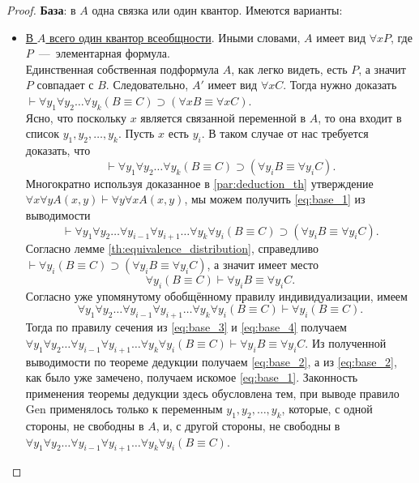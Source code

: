 \begin{proof}
    \textbf{База}: в $A$ одна связка или один квантор. Имеются варианты:
    \begin{itemize}
        \item \underline{В $A$ всего один квантор всеобщности}. Иными словами, $A$ имеет вид $\forall xP$, где $P$~---~элементарная формула. \\
        Единственная собственная подформула $A$, как легко видеть, есть $P$, а значит $P$ совпадает с $B$. Следовательно, $A'$ имеет вид $\forall xC$. Тогда нужно доказать $\vdash \forall y_1\forall y_2\dots\forall y_k(B \equiv C) \supset (\forall xB \equiv \forall xC)$. \\
        Ясно, что поскольку $x$ является связанной переменной в $A$, то она входит в список $y_1, y_2, \dots, y_k$. Пусть $x$ есть $y_i$. В таком случае от нас требуется доказать, что
        \begin{equation}\label{eq:base_1}
            \vdash \forall y_1\forall y_2\dots\forall y_k(B \equiv C) \supset (\forall y_iB \equiv \forall y_iC).
        \end{equation}
        Многократно используя доказанное в \ref{par:deduction_th} утверждение $\forall x\forall yA(x, y) \vdash \forall y\forall xA(x, y)$, мы можем получить \eqref{eq:base_1} из выводимости
        \begin{equation}\label{eq:base_2}
            \vdash \forall y_1\forall y_2\dots\forall y_{i - 1}\forall y_{i + 1}\dots\forall y_k\forall y_i(B \equiv C) \supset (\forall y_iB \equiv \forall y_iC). 
        \end{equation}
        Согласно лемме \ref{th:equivalence_distribution}, справедливо $\vdash \forall y_i(B \equiv C) \supset (\forall y_iB \equiv \forall y_iC)$, а значит имеет место 
        \begin{equation}\label{eq:base_3}
            \forall y_i(B \equiv C) \vdash \forall y_iB \equiv \forall y_iC.
        \end{equation} 
        Согласно уже упомянутому обобщённому правилу индивидуализации, имеем 
        \begin{equation}\label{eq:base_4}
            \forall y_1\forall y_2\dots\forall y_{i - 1}\forall y_{i + 1}\dots\forall y_k\forall y_i(B \equiv C) \vdash \forall y_i(B \equiv C). 
        \end{equation}
        Тогда по правилу сечения из \eqref{eq:base_3} и \eqref{eq:base_4} получаем $\forall y_1\forall y_2\dots\forall y_{i - 1}\forall y_{i + 1}\dots\forall y_k\forall y_i(B \equiv C) \vdash \forall y_iB \equiv \forall y_iC$. Из полученной выводимости по теореме дедукции получаем \eqref{eq:base_2}, а из \eqref{eq:base_2}, как было уже замечено, получаем искомое \eqref{eq:base_1}. Законность применения теоремы дедукции здесь обусловлена тем, при выводе правило Gen применялось только к переменным $y_1, y_2, \dots, y_k$, которые, с одной стороны, не свободны в $A$, и, с другой стороны, не свободны в $\forall y_1\forall y_2\dots\forall y_{i - 1}\forall y_{i + 1}\dots\forall y_k\forall y_i(B \equiv C)$.


\end{itemize}
\end{proof}
